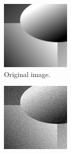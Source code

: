 \documentclass[abstracton]{scrreprt}
\begin{document}
            \begin{figure}[!ht]
                \centering
                \begin{subfigure}[b]{0.22\textwidth}
                    \includegraphics[width=\textwidth]{img/images/synth.png}
                    \caption{Original image.}
                \end{subfigure}
                \begin{subfigure}[b]{0.22\textwidth}
                    \includegraphics[width=\textwidth]{img/images/synth_gauss_noise.png}

\end{subfigure}
\end{figure}
\end{document}

